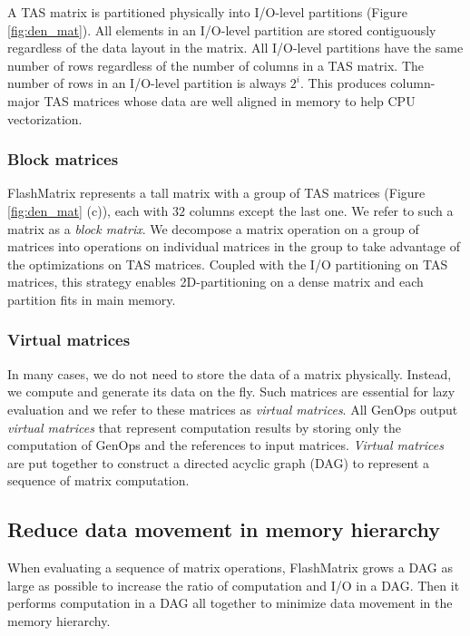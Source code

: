 A TAS matrix is partitioned physically into I/O-level partitions (Figure
\ref{fig:den_mat}). All elements in an I/O-level partition are stored
contiguously regardless of the data layout in the matrix. All I/O-level
partitions have the same number of rows regardless of
the number of columns in a TAS matrix. The number of rows in
an I/O-level partition is always $2^i$. This produces column-major TAS
matrices whose data are well aligned in memory to help CPU vectorization.

\subsubsection{Block matrices} \label{sec:block_mat}
FlashMatrix represents a tall matrix with a group of TAS matrices (Figure
\ref{fig:den_mat} (c)), each with $32$ columns except the last one. We refer
to such a matrix as a \textit{block matrix}. We decompose a matrix operation
on a group of matrices into operations on individual matrices in the group
to take advantage of the optimizations on TAS matrices.
Coupled with the I/O partitioning on TAS matrices, this strategy enables
2D-partitioning on a dense matrix and each partition fits in main memory.

\subsubsection{Virtual matrices} \label{virt_mat}
In many cases, we do not need to store the data of a matrix physically. Instead,
we compute and generate its data on the fly. Such matrices are essential for
lazy evaluation and we refer to these matrices as \textit{virtual matrices}.
All GenOps output \textit{virtual matrices} that represent computation
results by storing only the computation of GenOps and the references to input
matrices. \textit{Virtual matrices} are put together to construct a directed
acyclic graph (DAG) to represent a sequence of matrix computation.


\subsection{Reduce data movement in memory hierarchy}
When evaluating a sequence of matrix operations, FlashMatrix grows a DAG as
large as possible to increase the ratio of computation and I/O in a DAG.
Then it performs computation in a DAG all together to minimize data movement
in the memory hierarchy.


